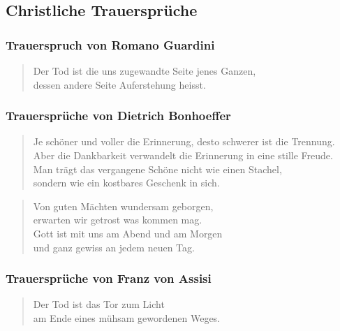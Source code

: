 \documentclass[ngerman,a4paper,11pt]{scrreprt}
\begin{document}
\clearpage

\subsection{Christliche Trauersprüche}
\label{sec-1-1-1-2}

\subsubsection*{Trauerspruch von Romano Guardini}
\label{sec-1-1-1-2-1}

\begin{verse}
Der Tod ist die uns zugewandte Seite jenes Ganzen, \\
dessen andere Seite Auferstehung heisst. \\
\end{verse}

\subsubsection*{Trauersprüche von Dietrich Bonhoeffer}
\label{sec-1-1-1-2-2}

\begin{verse}
Je schöner und voller die Erinnerung, desto schwerer ist die Trennung. \\
Aber die Dankbarkeit verwandelt die Erinnerung in eine stille Freude. \\
Man trägt das vergangene Schöne nicht wie einen Stachel, \\
sondern wie ein kostbares Geschenk in sich. \\
\end{verse}

\begin{verse}
Von guten Mächten wundersam geborgen, \\
erwarten wir getrost was kommen mag. \\
Gott ist mit uns am Abend und am Morgen \\
und ganz gewiss an jedem neuen Tag. \\
\end{verse}

\subsubsection*{Trauersprüche von Franz von Assisi}
\label{sec-1-1-1-2-3}

\begin{verse}
Der Tod ist das Tor zum Licht \\
am Ende eines mühsam gewordenen Weges. \\
\end{verse}
\end{document}
